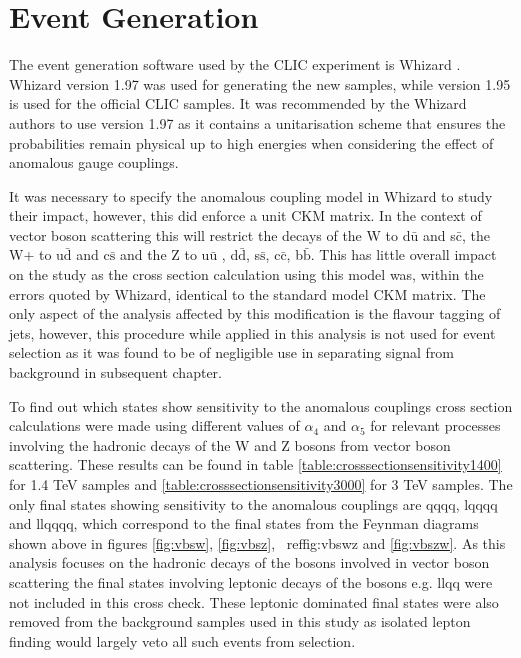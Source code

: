 \fi

\section{Event Generation}

The event generation software used by the CLIC experiment is Whizard \cite{0708.4233, hep-ph/0102195}. Whizard version 1.97 was used for generating the new samples, while version 1.95 is used for the official CLIC samples. It was recommended by the Whizard authors to use version 1.97 as it contains a unitarisation scheme that ensures the probabilities remain physical up to high energies when considering the effect of anomalous gauge couplings. 

It was necessary to specify the anomalous coupling model in Whizard to study their impact, however, this did enforce a unit CKM matrix. In the context of vector boson scattering this will restrict the decays of the W  to d$\bar{\text{u}}$ and s$\bar{\text{c}}$, the W+ to u$\bar{\text{d}}$ and c$\bar{\text{s}}$ and the Z to u$\bar{\text{u}}$ , d$\bar{\text{d}}$, s$\bar{\text{s}}$, c$\bar{\text{c}}$, b$\bar{\text{b}}$.  This has little overall impact on the study as the cross section calculation using this model was, within the errors quoted by Whizard, identical to the standard model CKM matrix.  The only aspect of the analysis affected by this modification is the flavour tagging of jets, however, this procedure while applied in this analysis is not used for event selection as it was found to be of negligible use in separating signal from background in subsequent chapter.

To find out which states show sensitivity to the anomalous couplings cross section calculations were made using different values of $\alpha_{4}$ and $\alpha_{5}$ for relevant processes involving the hadronic decays of the W and Z bosons from vector boson scattering.  These results can be found in table \ref{table:crosssectionsensitivity1400} for 1.4 TeV samples and \ref{table:crosssectionsensitivity3000} for 3 TeV samples.  The only final states showing sensitivity to the anomalous couplings are \nu{\nu}qqqq, l{\nu}qqqq and llqqqq, which correspond to the final states from the Feynman diagrams shown above in figures \ref{fig:vbsw}, \ref{fig:vbsz}, \ ref{fig:vbswz} and \ref{fig:vbszw}.  As this analysis focuses on the hadronic decays of the bosons involved in vector boson scattering the final states involving leptonic decays of the bosons e.g. \nu{\nu}llqq were not included in this cross check. These leptonic dominated final states were also removed from the background samples used in this study as isolated lepton finding would largely veto all such events from selection.

